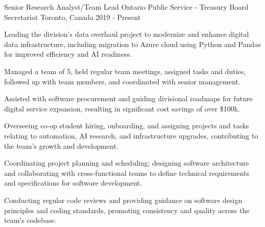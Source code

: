 

\begin{cventries}


\cventry
  {Senior Research Analyst/Team Lead}
  {Ontario Public Service - Treasury Board Secretariat}
  {Toronto, Canada}
  {2019 - Present}
  {
    \begin{cvitems}
      \item Leading the division's data overhaul project to modernize and enhance digital data infrastructure, including migration to Azure cloud using Python and Pandas for improved efficiency and AI readiness.
      \item Managed a team of 5, held regular team meetings, assigned tasks and duties, followed up with team members, and coordinated with senior management. 
      \item  Assisted with software procurement and guiding divisional roadmaps for future digital service expansion, resulting in significant cost savings of over \$100k.
      \item Overseeing co-op student hiring, onboarding, and assigning projects and tasks relating to automation, AI research, and infrastructure upgrades, contributing to the team's growth and development.
      \item Coordinating project planning and scheduling; designing software architecture and collaborating with cross-functional teams to define technical requirements and specifications for software development.
      \item Conducting regular code reviews and providing guidance on software design principles and coding standards, promoting consistency and quality across the team's codebase.
    \end{cvitems}
  }


\end{cventries}
